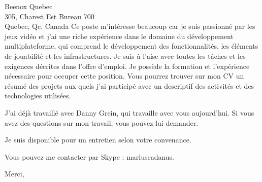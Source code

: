 \documentclass[11pt]{letter} %
\begin{document}
\begin{letter}{Beenox Quebec \\
305, Charest Est Bureau 700 \\
Quebec, Qc, Canada}
Ce poste m'intéresse beaucoup car je suis passionné par les jeux vidéo et j'ai une riche expérience dans le domaine du développement multiplateforme, qui comprend le développement des fonctionnalités, les éléments de jouabilité et les infrastructures. Je suis à l'aise avec toutes les tâches et les exigences décrites dans l'offre d'emploi. Je possède la formation et l'expérience nécessaire pour occuper cette position. Vous pourrez trouver sur mon CV un résumé des projets aux quels j'ai participé avec un descriptif des activités et des technologies utilisées.

J'ai déjà travaillé avec Danny Grein, qui travaille avec vous aujourd'hui. Si vous avez des questions sur mon travail, vous pouvez lui demander.

Je suis disponible pour un entretien selon votre convenance.

Vous pouvez me contacter par Skype : marluscadanus.

\closing{Merci, }


\end{letter}
\end{document}
